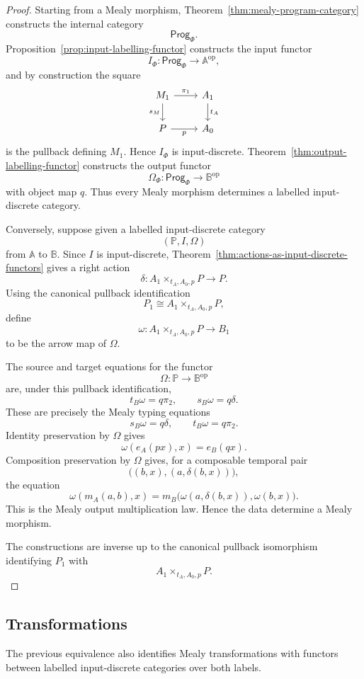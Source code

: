 \begin{proof}
Starting from a Mealy morphism, Theorem~\ref{thm:mealy-program-category} constructs the internal category
\[
\mathsf{Prog}_\Phi.
\]
Proposition~\ref{prop:input-labelling-functor} constructs the input functor
\[
I_\Phi:\mathsf{Prog}_\Phi\to\mathbb A^{\mathrm{op}},
\]
and by construction the square
\[
\begin{tikzcd}
M_1 \arrow[r, "\pi_1"] \arrow[d, "s_M"']
&
A_1 \arrow[d, "t_A"]
\\
P \arrow[r, "p"']
&
A_0
\end{tikzcd}
\]
is the pullback defining \(M_1\). Hence \(I_\Phi\) is input-discrete. Theorem~\ref{thm:output-labelling-functor} constructs the output functor
\[
\Omega_\Phi:\mathsf{Prog}_\Phi\to\mathbb B^{\mathrm{op}}
\]
with object map \(q\). Thus every Mealy morphism determines a labelled input-discrete category.

Conversely, suppose given a labelled input-discrete category
\[
(\mathbb P,I,\Omega)
\]
from \(\mathbb A\) to \(\mathbb B\). Since \(I\) is input-discrete, Theorem~\ref{thm:actions-as-input-discrete-functors} gives a right action
\[
\delta:A_1\times_{t_A,A_0,p}P\to P.
\]
Using the canonical pullback identification
\[
P_1\cong A_1\times_{t_A,A_0,p}P,
\]
define
\[
\omega:A_1\times_{t_A,A_0,p}P\to B_1
\]
to be the arrow map of \(\Omega\).

The source and target equations for the functor
\[
\Omega:\mathbb P\to\mathbb B^{\mathrm{op}}
\]
are, under this pullback identification,
\[
t_B\omega=q\pi_2,
\qquad
s_B\omega=q\delta.
\]
These are precisely the Mealy typing equations
\[
s_B\omega=q\delta,
\qquad
t_B\omega=q\pi_2.
\]
Identity preservation by \(\Omega\) gives
\[
\omega(e_A(px),x)=e_B(qx).
\]
Composition preservation by \(\Omega\) gives, for a composable temporal pair
\[
\bigl((b,x),(a,\delta(b,x))\bigr),
\]
the equation
\[
\omega(m_A(a,b),x)
=
m_B\bigl(\omega(a,\delta(b,x)),\omega(b,x)\bigr).
\]
This is the Mealy output multiplication law. Hence the data determine a Mealy morphism.

The constructions are inverse up to the canonical pullback isomorphism identifying \(P_1\) with
\[
A_1\times_{t_A,A_0,p}P.
\]
\end{proof}

\subsection{Transformations}

The previous equivalence also identifies Mealy transformations with functors between labelled input-discrete categories over both labels.


